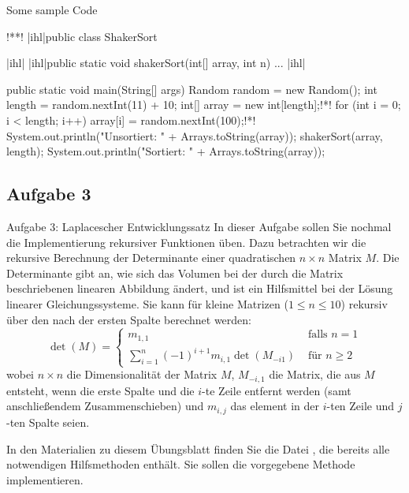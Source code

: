 \begin{frame}[c,fragile]{Some sample Code}
\SetupLstHl
\begin{plainjava}
!**!
|ihl|public class ShakerSort {|ihl|
    |ihl|public static void shakerSort(int[] array, int n) { ... }|ihl|

    public static void main(String[] args) {
        Random random = new Random();
        int length = random.nextInt(11) + 10;
        int[] array = new int[length];!*\smallskip*!
        for (int i = 0; i < length; i++)
           array[i] = random.nextInt(100);!*\smallskip*!
        System.out.println("Unsortiert: " + Arrays.toString(array));
        shakerSort(array, length);
        System.out.println("Sortiert: " + Arrays.toString(array));
     }
}
\end{plainjava}
\end{frame}

\subsection{Aufgabe 3}
\begin{frame}[c]{Aufgabe 3: Laplacescher Entwicklungssatz}
    In dieser Aufgabe sollen Sie nochmal die Implementierung rekursiver Funktionen üben. Dazu betrachten wir die
    rekursive Berechnung der Determinante einer quadratischen \(n \times n\) Matrix \(M\). Die Determinante gibt an, wie sich
    das Volumen bei der durch die Matrix beschriebenen linearen Abbildung ändert, und ist ein Hilfsmittel bei der
    Lösung linearer Gleichungssysteme. Sie kann für kleine Matrizen (\(1 \leq n \leq 10\)) rekursiv über den  nach der ersten Spalte berechnet werden:
    \begin{equation*}
        \det(M) = \begin{cases}
            m_{1,1} & \text{ falls } n = 1\\
            \sum_{i = 1}^n (-1)^{i + 1} m_{i, 1} \det(M_{-i 1}) & \text{ für } n \geq 2
        \end{cases}
    \end{equation*}
    wobei \(n \times n\) die Dimensionalität der Matrix \(M\), \(M_{-i, 1}\) die Matrix, die aus \(M\) entsteht, wenn die erste Spalte und die \(i\)-te Zeile entfernt werden (samt anschließendem Zusammenschieben) und \(m_{i, j}\) das element in der \(i\)-ten Zeile und \(j\)-ten Spalte seien.

    In den Materialien zu diesem Übungsblatt finden Sie die Datei , die bereits alle notwendigen
    Hilfsmethoden enthält. Sie sollen die vorgegebene Methode  implementieren.
\endtaskblock
\end{frame}

